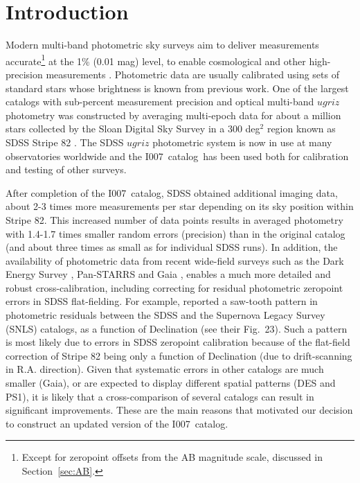 \documentclass[fleqn,usenatbib]{mnras}
\newcommand{\pO}{\hbox{I007}}
\newcommand{\pOc}{\hbox{I007 catalog}}
\begin{document}


\section{Introduction} \label{sec:intro}

Modern multi-band photometric sky surveys aim to deliver measurements accurate\footnote{Except for zeropoint offsets from the AB magnitude scale, discussed in Section~\ref{sec:AB}.} at the 1\% (0.01 mag) level, to enable cosmological and other high-precision measurements \cite[e.g., the Vera C. Rubin Observatory Legacy Survey of Space and Time,][]{LSSToverview}. Photometric data are usually calibrated using sets of standard stars whose brightness is known from previous work. One of the largest catalogs with sub-percent measurement precision and optical multi-band $ugriz$ photometry
was constructed by averaging multi-epoch data for about a million stars collected by the Sloan Digital Sky Survey \citep[SDSS,][]{York2000}  in a 300 deg$^2$ region known as SDSS Stripe 82 \citep[][hereafter \pO]{Ivez07}. The SDSS $ugriz$ photometric system is now in use at many observatories worldwide and the \pOc\ has been used both for calibration and testing of other surveys. 

After completion of the \pOc, SDSS obtained additional imaging data, about 2-3 times more measurements 
per star depending on its sky position within Stripe 82. This increased number of data points results in averaged photometry with
1.4-1.7 times smaller random errors (precision) than in the original catalog (and about three times as small as for individual 
SDSS runs). In addition, the availability of photometric data from recent wide-field surveys such as the 
Dark Energy Survey \citep[DES,][]{2016MNRAS.460.1270D}, Pan-STARRS \citep[PS1,][]{2010SPIE.7733E..0EK} and Gaia \citep{GaiaCollab2018b}, enables a much more detailed and robust cross-calibration, including
correcting for residual photometric zeropoint errors in SDSS flat-fielding. For example, \cite{2013A&A...552A.124B}
reported a saw-tooth pattern in photometric residuals between the SDSS and the Supernova Legacy Survey (SNLS) catalogs, as a function of Declination (see their Fig.~23). Such a pattern is most likely due to errors in SDSS zeropoint calibration because
of the flat-field correction of Stripe 82 being only a function of Declination (due to drift-scanning in R.A. direction). 
Given that systematic errors in other catalogs are much smaller (Gaia), or are expected to display different 
spatial patterns (DES and PS1), it is likely that a cross-comparison of several catalogs can result in
significant improvements. These are the main reasons that motivated our decision to construct an updated version of the \pOc. 
 
\end{document}
